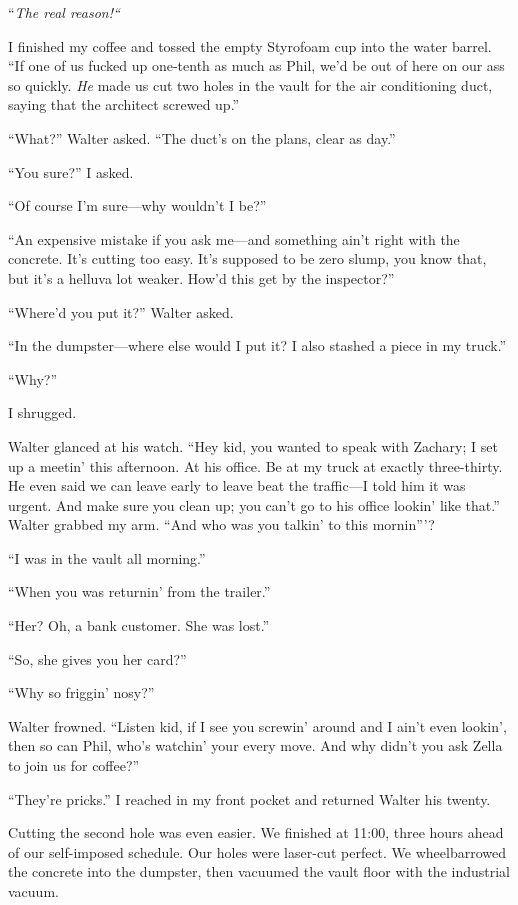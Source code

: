 ``\emph{The real reason!{}``}

I finished my coffee and tossed the empty Styrofoam cup into the water
barrel. ``If one of us fucked up one-tenth as much as Phil, we'd be out
of here on our ass so quickly. \emph{He} made us cut two holes in the
vault for the air conditioning duct, saying that the architect screwed
up.''

``What?'' Walter asked. ``The duct's on the plans, clear as day.''

``You sure?'' I asked.

``Of course I'm sure---why wouldn't I be?''

``An expensive mistake if you ask me---and something ain't right with
the concrete. It's cutting too easy. It's supposed to be zero slump, you
know that, but it's a helluva lot weaker. How'd this get by the
inspector?''

``Where'd you put it?'' Walter asked.

``In the dumpster---where else would I put it? I also stashed a piece in
my truck.''

``Why?''

I shrugged.

Walter glanced at his watch. ``Hey kid, you wanted to speak with
Zachary; I set up a meetin' this afternoon. At his office. Be at my
truck at exactly three-thirty. He even said we can leave early to leave
beat the traffic---I told him it was urgent. And make sure you clean up;
you can't go to his office lookin' like that.'' Walter grabbed my arm.
``And who was you talkin' to this mornin'''?

``I was in the vault all morning.''

``When you was returnin' from the trailer.''

``Her? Oh, a bank customer. She was lost.''

``So, she gives you her card?''

``Why so friggin' nosy?''

Walter frowned. ``Listen kid, if I see you screwin' around and I ain't
even lookin', then so can Phil, who's watchin' your every move. And why
didn't you ask Zella to join us for coffee?''

``They're pricks.'' I reached in my front pocket and returned Walter his
twenty.

Cutting the second hole was even easier. We finished at 11:00, three
hours ahead of our self-imposed schedule. Our holes were laser-cut
perfect. We wheelbarrowed the concrete into the dumpster, then vacuumed
the vault floor with the industrial vacuum.

